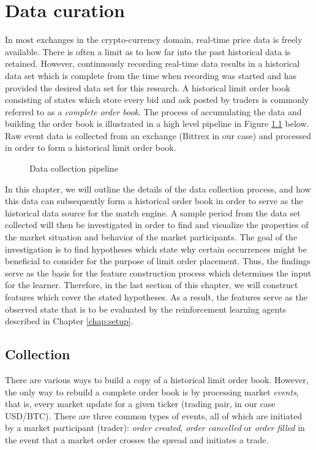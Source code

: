 \chapter{Data curation}
\label{chap:data}

In most exchanges in the crypto-currency domain, real-time price data is freely available. 
There is often a limit as to how far into the past historical data is retained.
However, continuously recording real-time data results in a historical data set which is complete from the time when recording was started and has provided the desired data set for this research.
A historical limit order book consisting of states which store every bid and ask posted by traders is commonly referred to as a \textit{complete order book}.
The process of accumulating the data and building the order book is illustrated in a high level pipeline in Figure \ref{fig:data-pipeline} below.
Raw event data is collected from an exchange (Bittrex in our case) and processed in order to form a historical limit order book.
\begin{figure}[H]
    \centering
    \caption{Data collection pipeline}
    \label{fig:data-pipeline}
\end{figure}

In this chapter, we will outline the details of the data collection process, and how this data can subsequently form a historical order book in order to serve as the historical data source for the match engine.
A sample period from the data set collected will then be investigated in order to find and visualize the properties of the market situation and behavior of the market participants.
The goal of the investigation is to find hypotheses which state why certain occurrences might be beneficial to consider for the purpose of limit order placement.
Thus, the findings serve as the basis for the feature construction process which determines the input for the learner.
Therefore, in the last section of this chapter, we will construct features which cover the stated hypotheses.
As a result, the features serve as the observed state that is to be evaluated by the reinforcement learning agents described in Chapter \ref{chap:setup}.

\section{Collection}
\label{sec:data-collection}

There are various ways to build a copy of a historical limit order book. However, the only way to rebuild a complete order book is by processing market \textit{events}, that is, every market update for a given ticker (trading pair, in our case USD/BTC).
There are three common types of events, all of which are initiated by a market participant (trader): \textit{order created}, \textit{order cancelled} or \textit{order filled} in the event that a market order crosses the spread and initiates a trade.

